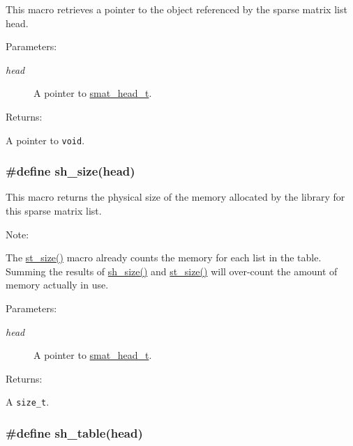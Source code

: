This macro retrieves a pointer to the object referenced by the sparse matrix list head.\begin{Desc}
\item[Parameters: ]\par
\begin{description}
\item[{\em 
head}]A pointer to \hyperlink{group__dbprim__smat_a1}{smat\_\-head\_\-t}.\end{description}
\end{Desc}
\begin{Desc}
\item[Returns: ]\par
A pointer to {\tt void}. \end{Desc}
\hypertarget{group__dbprim__smat_a38}{
\subsubsection[sh\_\-size]{\setlength{\rightskip}{0pt plus 5cm}\#define sh\_\-size(head)}}
\label{group__dbprim__smat_a38}


This macro returns the physical size of the memory allocated by the library for this sparse matrix list.

\begin{Desc}
\item[Note: ]\par
The \hyperlink{group__dbprim__smat_a28}{st\_\-size()} macro already counts the memory for each list in the table. Summing the results of \hyperlink{group__dbprim__smat_a38}{sh\_\-size()} and \hyperlink{group__dbprim__smat_a28}{st\_\-size()} will over-count the amount of memory actually in use.\end{Desc}
\begin{Desc}
\item[Parameters: ]\par
\begin{description}
\item[{\em 
head}]A pointer to \hyperlink{group__dbprim__smat_a1}{smat\_\-head\_\-t}.\end{description}
\end{Desc}
\begin{Desc}
\item[Returns: ]\par
A {\tt size\_\-t}. \end{Desc}
\hypertarget{group__dbprim__smat_a32}{
\subsubsection[sh\_\-table]{\setlength{\rightskip}{0pt plus 5cm}\#define sh\_\-table(head)}}
\label{group__dbprim__smat_a32}


